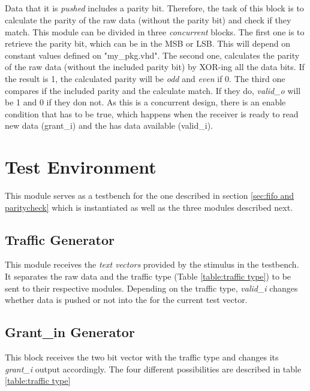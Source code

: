 \documentclass[12pt]{article}
\begin{document}
\subsection{\paritycheck}

Data that it is \textit{pushed} includes a parity bit. Therefore, the task of this block is to calculate the parity of the raw data (without the parity bit) and check if they match. This module can be divided in three \textit{concurrent} blocks. The first one is to retrieve the parity bit, which can be in the MSB or LSB. This will depend on constant values defined on "my\_pkg.vhd". The second one, calculates the parity of the raw data (without the included parity bit) by XOR-ing all the data bits. If the result is 1, the calculated parity will be \textit{odd} and \textit{even} if 0. The third one compares if the included parity and the calculate match. If they do, \textit{valid\_o} will be 1 and 0 if they don not. As this is a concurrent design, there is an enable condition that has to be true, which happens when the receiver is ready to read new data (grant\_i) and the \fifo has data available (valid\_i). 

\section{Test Environment}
This module serves as a testbench for the one described in section \ref{sec:fifo and paritycheck} which is instantiated as well as the three modules described next.

\subsection{Traffic Generator}
This module receives the \textit{text vectors} provided by the stimulus in the testbench. It separates the raw data and the traffic type (Table \ref{table:traffic type}) to be sent to their respective modules. Depending on the traffic type, \textit{valid\_i} changes whether data is pushed or not into the \fifo for the current test vector.

\subsection{Grant\_in Generator}
This block receives the two bit vector with the traffic type and changes its \textit{grant\_i} output accordingly.  The four different possibilities are described in table \ref{table:traffic type}
\end{document}
